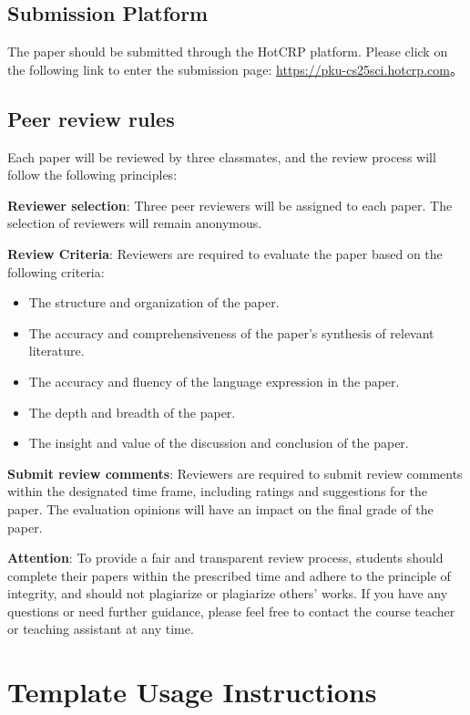 \documentclass[11pt,en]{elegantpaper}
\begin{document}
\subsection{Submission Platform}
The paper should be submitted through the HotCRP platform. Please click on the following link to enter the submission page: \href{https://pku-cs25sci.hotcrp.com/}{https://pku-cs25sci.hotcrp.com}。
 
\subsection{Peer review rules}
Each paper will be reviewed by three classmates, and the review process will follow the following principles:

\textbf{Reviewer selection}: Three peer reviewers will be assigned to each paper. The selection of reviewers will remain anonymous.

\textbf{Review Criteria}: Reviewers are required to evaluate the paper based on the following criteria:
\begin{itemize}
    \item The structure and organization of the paper.
    \item The accuracy and comprehensiveness of the paper's synthesis of relevant literature.
    \item The accuracy and fluency of the language expression in the paper.
    \item The depth and breadth of the paper.
    \item The insight and value of the discussion and conclusion of the paper.
\end{itemize}

\textbf{Submit review comments}: Reviewers are required to submit review comments within the designated time frame, including ratings and suggestions for the paper. The evaluation opinions will have an impact on the final grade of the paper.

\textbf{Attention}: To provide a fair and transparent review process, students should complete their papers within the prescribed time and adhere to the principle of integrity, and should not plagiarize or plagiarize others' works. If you have any questions or need further guidance, please feel free to contact the course teacher or teaching assistant at any time.

\section{Template Usage Instructions}
\end{document}

